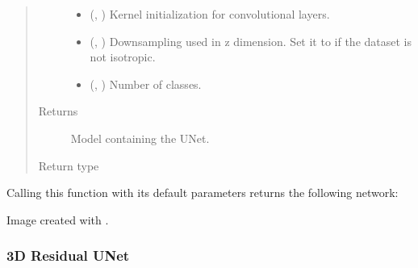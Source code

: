 \documentclass[letterpaper,10pt,english]{sphinxmanual}
\begin{document}
\begin{fulllineitems}
\begin{quote}
\begin{description}
\begin{itemize}
\item {} 
 (, ) \textendash{} Kernel initialization for convolutional layers.

\item {} 
 (, ) \textendash{} Downsampling used in z dimension. Set it to  if the dataset is not isotropic.

\item {} 
 (, ) \textendash{} Number of classes.

\end{itemize}

\item[{Returns}] \leavevmode
{} \textendash{} Model containing the U\sphinxhyphen{}Net.

\item[{Return type}] \leavevmode
{}

\end{description}\end{quote}

Calling this function with its default parameters returns the following network:


Image created with .

\end{fulllineitems}



\subsubsection{3D Residual U\sphinxhyphen{}Net}
\label{\detokenize{models/resunet_3d:module-models.resunet_3d}}\label{\detokenize{models/resunet_3d:d-residual-u-net}}\label{\detokenize{models/resunet_3d::doc}}
\end{document}
